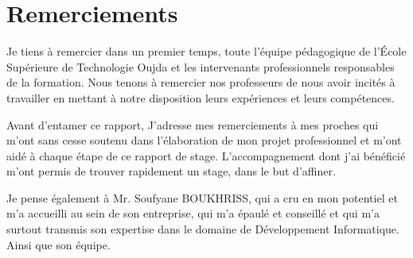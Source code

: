 \chapter*{Remerciements}


\hspace{16pt}Je tiens à remercier dans un premier temps, toute l’équipe pédagogique
de l’École Supérieure de Technologie Oujda et les intervenants professionnels
responsables de la formation. Nous tenons à remercier nos professeurs de nous
avoir incités à travailler en mettant à notre disposition leurs expériences et
leurs compétences.
\vspace{12pt}

Avant d’entamer ce rapport, J’adresse mes remerciements à mes proches
qui m’ont sans cesse soutenu dans l’élaboration de mon projet professionnel
et m’ont aidé à chaque étape de ce rapport de stage. L’accompagnement
dont j’ai bénéficié m’ont permis de trouver rapidement un stage, dans le but
d’affiner.
\vspace{12pt}

Je pense également à Mr. Soufyane BOUKHRISS, qui a cru en mon potentiel
et m’a accueilli au sein de son entreprise, qui m’a épaulé et conseillé et
qui m’a surtout transmis son expertise dans le domaine de Développement
Informatique. Ainsi que son équipe.
